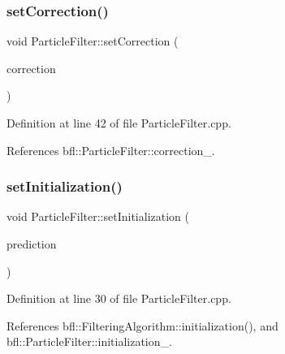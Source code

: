 \subsubsection{\texorpdfstring{set\+Correction()}{setCorrection()}}
{\footnotesize\ttfamily void Particle\+Filter\+::set\+Correction (\begin{DoxyParamCaption}\item[{std\+::unique\+\_\+ptr$<$ \mbox{\hyperlink{classbfl_1_1PFCorrection}{P\+F\+Correction}} $>$}]{correction }\end{DoxyParamCaption})\hspace{0.3cm}{\ttfamily [inherited]}}



Definition at line 42 of file Particle\+Filter.\+cpp.



References bfl\+::\+Particle\+Filter\+::correction\+\_\+.

\mbox{\label{classbfl_1_1ParticleFilter_abfeb75fd575802f362039c26169eed8b}} 
\subsubsection{\texorpdfstring{set\+Initialization()}{setInitialization()}}
{\footnotesize\ttfamily void Particle\+Filter\+::set\+Initialization (\begin{DoxyParamCaption}\item[{std\+::unique\+\_\+ptr$<$ \mbox{\hyperlink{classbfl_1_1Initialization}{Initialization}} $>$}]{prediction }\end{DoxyParamCaption})\hspace{0.3cm}{\ttfamily [inherited]}}



Definition at line 30 of file Particle\+Filter.\+cpp.



References bfl\+::\+Filtering\+Algorithm\+::initialization(), and bfl\+::\+Particle\+Filter\+::initialization\+\_\+.

